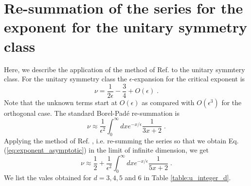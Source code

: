 \documentclass[singlecolumn]{jpsj3}
\begin{document}
\section{Re-summation of the series for the exponent for the unitary symmetry class}\label{sec:previous_method}

Here, we describe the application of the method of Ref.  to the unitary symmtery class.
For the unitary symmetry class the $\epsilon$-expansion for the critical exponent is
\begin{equation}
  \nu = \frac{1}{2 \epsilon} - \frac{3}{4} + O(\epsilon) \;.
\end{equation}
Note that the unknown terms start at $O(\epsilon)$ as compared with $O(\epsilon^3)$ for the orthogonal case.
The standard Borel-Pad\'e re-summation is
\begin{equation}\label{eq:stdunitary}
   \nu  \approx \frac{1}{\epsilon^2} \int_{0}^{\infty}dx e^{-x/\epsilon}
    \frac{1}{3x+2} \;.
\end{equation}
Applying the method of Ref. , i.e. re-summing the series so that we obtain Eq. (\ref{eq:exponent_asymptotic}) in the limit of infinite
dimension, we get
\begin{equation}\label{eq:prevunitary}
   \nu  \approx \frac{1}{2} + \frac{1}{\epsilon^2} \int_{0}^{\infty}dx e^{-x/\epsilon}
    \frac{1}{5x+2} \;.
\end{equation}
We list the vales obtained for $d=3, 4, 5$ and $6$ in Table \ref{table:u_integer_d}.
\end{document}
